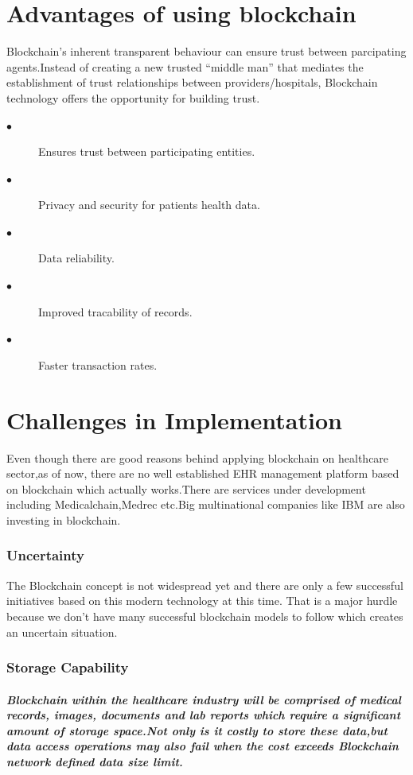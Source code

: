 \documentclass[12pt]{report}
\begin{document}
\chapter{Advantages of using blockchain}
Blockchain's inherent transparent behaviour can ensure trust between parcipating agents.Instead of creating a new trusted “middle man” that mediates the establishment of
trust relationships between providers/hospitals, Blockchain technology offers the opportunity
for building trust.

\begin{description}
\item[$\bullet$]Ensures trust between participating entities.
\item[$\bullet$]Privacy and security for patients health data.
\item[$\bullet$]Data reliability.
\item[$\bullet$]Improved tracability of records.
\item[$\bullet$]Faster transaction rates.
\end{description}

\chapter{Challenges in Implementation}
Even though there are good reasons behind applying blockchain on healthcare sector,as of now, there are no well established EHR management platform based on blockchain which actually works.There are services under development including Medicalchain,Medrec etc.Big multinational companies like IBM are also investing in blockchain.

\subsection{Uncertainty}
The Blockchain concept is not widespread yet and there are only a few successful initiatives based on this modern technology at this time. That is a major hurdle because we don’t have many successful blockchain models to follow which creates an uncertain situation.
\subsection{Storage Capability}
\paragraph{Blockchain within the healthcare industry will be comprised of medical records, images, documents and lab reports which require a significant amount of storage space.Not only is it costly to store these data,but data access operations may also fail when the cost exceeds Blockchain network defined
data size limit.}
\end{document}
